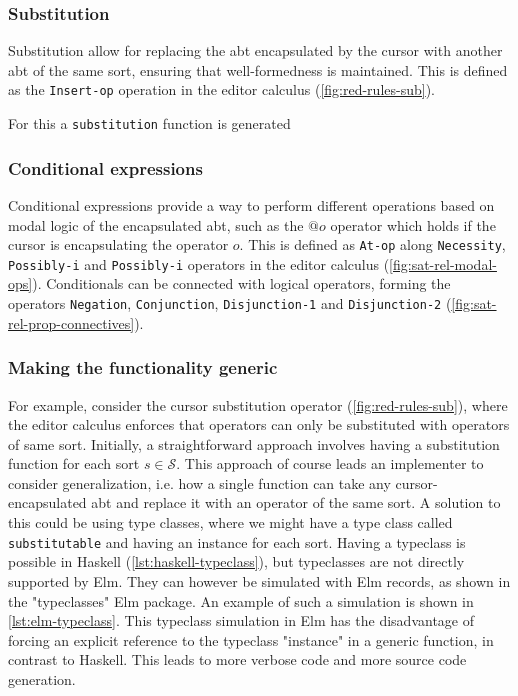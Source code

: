 \subsubsection{Substitution}
Substitution allow for replacing the abt encapsulated by the cursor with another
abt of the same sort, ensuring that well-formedness is maintained.
This is defined as the \texttt{Insert-op} operation in the editor calculus
(\cref{fig:red-rules-sub}).

For this a \texttt{substitution} function is generated 

\subsubsection{Conditional expressions}
Conditional expressions provide a way to perform different operations based on
modal logic of the encapsulated abt, such as the $@o$ operator which holds
if the cursor is encapsulating the operator $o$. This is defined as \texttt{At-op}
along \texttt{Necessity}, \texttt{Possibly-i} and \texttt{Possibly-i} operators
in the editor calculus\cite{aalborg} (\cref{fig:sat-rel-modal-ops}). Conditionals
can be connected with logical operators, forming the operators \texttt{Negation},
\texttt{Conjunction}, \texttt{Disjunction-1} and \texttt{Disjunction-2}
(\cref{fig:sat-rel-prop-connectives}).





\subsubsection{Making the functionality generic}

For example, consider the cursor substitution operator (\cref{fig:red-rules-sub}),
where the editor calculus enforces that operators can only be substituted
with operators of same sort. Initially, a straightforward approach involves
having a substitution function for each sort $s \in \mathcal{S}$.
This approach of course leads an implementer to consider generalization,
i.e. how a single function can take any cursor-encapsulated abt and replace it
with an operator of the same sort. A solution to this could be
using type classes, where we might have a type class called \texttt{substitutable}
and having an instance for each sort.
Having a typeclass is possible in Haskell (\cref{lst:haskell-typeclass}),
but typeclasses are not directly supported by Elm.
They can however be simulated with Elm records, as shown in the "typeclasses"
Elm package\cite{elm-typeclass-package}.
An example of such a simulation is shown in \cref{lst:elm-typeclass}.
This typeclass simulation in Elm has the disadvantage of forcing an explicit
reference to the typeclass "instance" in a generic function, in contrast to Haskell.
This leads to more verbose code and more source code generation.

